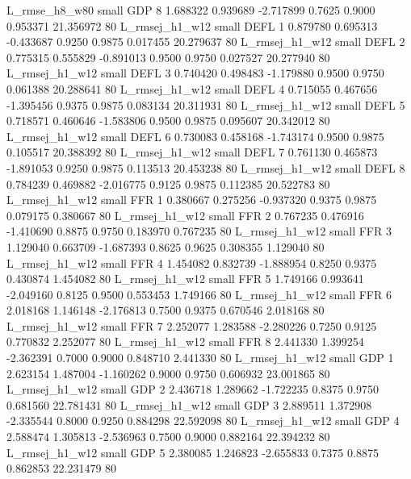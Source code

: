  L_rmse_h8_w80      small      GDP                 8 1.688322 0.939689 -2.717899 0.7625 0.9000  0.953371   21.356972 80
L_rmsej_h1_w12      small     DEFL                 1 0.879780 0.695313 -0.433687 0.9250 0.9875  0.017455   20.279637 80
L_rmsej_h1_w12      small     DEFL                 2 0.775315 0.555829 -0.891013 0.9500 0.9750  0.027527   20.277940 80
L_rmsej_h1_w12      small     DEFL                 3 0.740420 0.498483 -1.179880 0.9500 0.9750  0.061388   20.288641 80
L_rmsej_h1_w12      small     DEFL                 4 0.715055 0.467656 -1.395456 0.9375 0.9875  0.083134   20.311931 80
L_rmsej_h1_w12      small     DEFL                 5 0.718571 0.460646 -1.583806 0.9500 0.9875  0.095607   20.342012 80
L_rmsej_h1_w12      small     DEFL                 6 0.730083 0.458168 -1.743174 0.9500 0.9875  0.105517   20.388392 80
L_rmsej_h1_w12      small     DEFL                 7 0.761130 0.465873 -1.891053 0.9250 0.9875  0.113513   20.453238 80
L_rmsej_h1_w12      small     DEFL                 8 0.784239 0.469882 -2.016775 0.9125 0.9875  0.112385   20.522783 80
L_rmsej_h1_w12      small      FFR                 1 0.380667 0.275256 -0.937320 0.9375 0.9875  0.079175    0.380667 80
L_rmsej_h1_w12      small      FFR                 2 0.767235 0.476916 -1.410690 0.8875 0.9750  0.183970    0.767235 80
L_rmsej_h1_w12      small      FFR                 3 1.129040 0.663709 -1.687393 0.8625 0.9625  0.308355    1.129040 80
L_rmsej_h1_w12      small      FFR                 4 1.454082 0.832739 -1.888954 0.8250 0.9375  0.430874    1.454082 80
L_rmsej_h1_w12      small      FFR                 5 1.749166 0.993641 -2.049160 0.8125 0.9500  0.553453    1.749166 80
L_rmsej_h1_w12      small      FFR                 6 2.018168 1.146148 -2.176813 0.7500 0.9375  0.670546    2.018168 80
L_rmsej_h1_w12      small      FFR                 7 2.252077 1.283588 -2.280226 0.7250 0.9125  0.770832    2.252077 80
L_rmsej_h1_w12      small      FFR                 8 2.441330 1.399254 -2.362391 0.7000 0.9000  0.848710    2.441330 80
L_rmsej_h1_w12      small      GDP                 1 2.623154 1.487004 -1.160262 0.9000 0.9750  0.606932   23.001865 80
L_rmsej_h1_w12      small      GDP                 2 2.436718 1.289662 -1.722235 0.8375 0.9750  0.681560   22.781431 80
L_rmsej_h1_w12      small      GDP                 3 2.889511 1.372908 -2.335544 0.8000 0.9250  0.884298   22.592098 80
L_rmsej_h1_w12      small      GDP                 4 2.588474 1.305813 -2.536963 0.7500 0.9000  0.882164   22.394232 80
L_rmsej_h1_w12      small      GDP                 5 2.380085 1.246823 -2.655833 0.7375 0.8875  0.862853   22.231479 80
